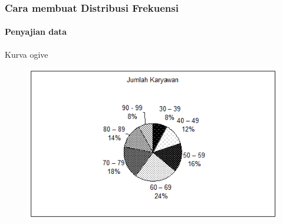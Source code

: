 \documentclass[main.tex]{subfiles}
\begin{document}
\begin{frame}[c]
	\frametitle{Cara membuat Distribusi Frekuensi}
	\framesubtitle{Penyajian data}
	Kurva ogive
	\begin{figure}
		\begin{center}
			\includegraphics[scale=0.6]{figures/graph3}
		\end{center}
	\end{figure}
\end{frame}
\end{document}
